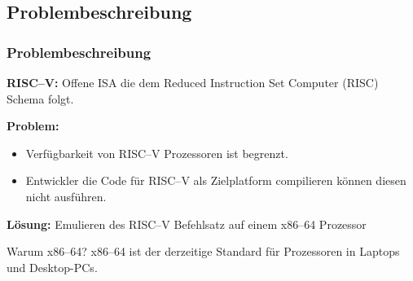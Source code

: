 \subsection{Problembeschreibung} %
\begin{frame}
    \frametitle{Problembeschreibung}

    \vspace{0.50cm}

    \textbf{RISC--V:} Offene ISA die dem Reduced Instruction Set Computer (RISC) Schema folgt.

    \vspace{0.50cm}

    \textbf{Problem:}
    \begin{itemize}
        \item Verfügbarkeit von RISC--V Prozessoren ist begrenzt.
        \item Entwickler die Code für RISC--V als Zielplatform compilieren können diesen nicht ausführen.
    \end{itemize}

    \vspace{0.50cm}

    \textbf{Lösung:} Emulieren des RISC--V Befehlsatz auf einem x86--64 Prozessor

    \vspace{0.50cm}

    \begin{block}{Warum x86--64?}
        x86--64 ist der derzeitige Standard für Prozessoren in Laptops und Desktop-PCs.
    \end{block}
\end{frame}

